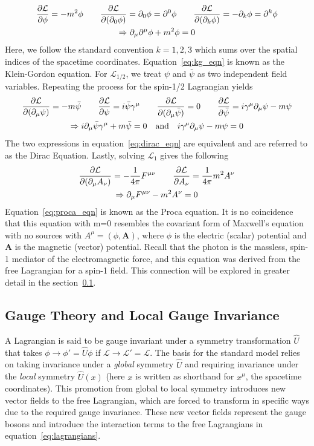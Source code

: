 \begin{gather}
	\pdv{\mathcal{L}}{\phi}=-m^2\phi \qquad
	\pdv{\mathcal{L}}{(\partial_0\phi)}=\partial_0\phi=\partial^0\phi \qquad
	\pdv{\mathcal{L}}{(\partial_k\phi)}=-\partial_k\phi=\partial^k\phi	\\
	\Rightarrow \partial_\mu\partial^\mu\phi+m^2\phi=0 \label{eq:kg_eqn}
\end{gather}
Here, we follow the standard convention $k=1,2,3$ which sums over the spatial indices of the spacetime coordinates. Equation~\ref{eq:kg_eqn} is known as the Klein-Gordon equation. For $\mathcal{L}_{1/2}$, we treat $\psi$ and $\bar{\psi}$ as two independent field variables. Repeating the process for the spin-1/2 Lagrangian yields
\begin{gather}
	\pdv{\mathcal{L}}{(\partial_\mu\psi)}=-m\bar{\psi} \qquad \pdv{\mathcal{L}}{\psi}=i\bar{\psi}\gamma^\mu \qquad
	\pdv{\mathcal{L}}{(\partial_\mu\bar{\psi})}=0 \qquad
	\pdv{\mathcal{L}}{\bar{\psi}}=i\gamma^\mu\partial_\mu\psi-m\psi	\\
	\Rightarrow i\partial_\mu\bar{\psi}\gamma^\mu+m\bar{\psi}=0 \quad \text{and} \quad i\gamma^\mu\partial_\mu\psi-m\psi=0 \label{eq:dirac_eqn}
\end{gather}
The two expressions in equation~\ref{eq:dirac_eqn} are equivalent and are referred to as the Dirac Equation. Lastly, solving $\mathcal{L}_1$ gives the following
\begin{gather}
	\pdv{\mathcal{L}}{(\partial_\mu A_\nu)}=-\frac{1}{4\pi}F^{\mu\nu} \qquad \pdv{\mathcal{L}}{A_\nu}=\frac{1}{4\pi}m^2A^\nu \\
	\Rightarrow \partial_\mu F^{\mu\nu}-m^2A^\nu=0 \label{eq:proca_eqn}
\end{gather}
Equation~\ref{eq:proca_eqn} is known as the Proca equation. It is no coincidence that this equation with m=0 resembles the covariant form of Maxwell's equation with no sources with $A^\mu=(\phi, \mathbf{A})$, where $\phi$ is the electric (scalar) potential and $\mathbf{A}$ is the magnetic (vector) potential. Recall that the photon is the massless, spin-1 mediator of the electromagnetic force, and this equation was derived from the free Lagrangian for a spin-1 field. This connection will be explored in greater detail in the section~\ref{sec:sm_theory_gauge}.

\subsection{Gauge Theory and Local Gauge Invariance} \label{sec:sm_theory_gauge}
A Lagrangian is said to be gauge invariant under a symmetry transformation $\hat{U}$ that takes $\phi\to\phi'=\hat{U}\phi$ if $\mathcal{L}\to\mathcal{L}'=\mathcal{L}$. The basis for the standard model relies on taking invariance under a \textit{global} symmetry $\hat{U}$ and requiring invariance under the \textit{local} symmetry $\hat{U}(x)$ (here $x$ is written as shorthand for $x^\mu$, the spacetime coordinates). This promotion from global to local symmetry introduces new vector fields to the free Lagrangian, which are forced to transform in specific ways due to the required gauge invariance. These new vector fields represent the gauge bosons and introduce the interaction terms to the free Lagrangians in equation~\ref{eq:lagrangians}.


